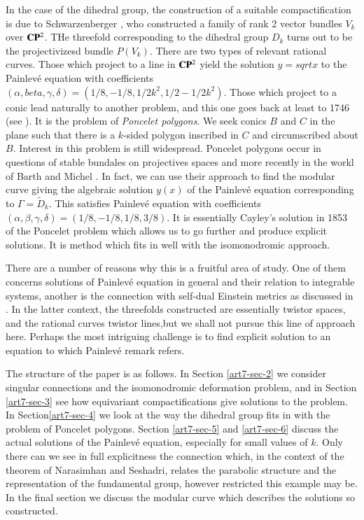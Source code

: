 In the case of the dihedral group, the construction of a suitable compactification is due to Schwarzenberger \cite{art6-key16}, who constructed a family of rank 2 vector bundles $V_{k}$ over $\mathbf{C}\mathbf{P}^{2}$. THe threefold corresponding to the dihedral group $D_{k}$ turns out to be the projectivizesd bundle $P(V_{k})$. There are two types of relevant rational curves. Those which project to a line in $\mathbf{C}\mathbf{P}^{2}$ yield the solution $y =sqrt{x}$ to the Painlev\'e equation with coefficients $(\alpha, beta, \gamma, \delta) = (1/8, -1/8, 1/2k^{2}, 1/2-1/2k^{2})$. Those which project to a conic lead naturally to another problem, and this one goes back at least to 1746 (see \cite{art7-key3}). It is the problem of \textit{Poncelet polygons}. We seek conics $B$ and $C$ in the plane such that there is a $k$-sided polygon inscribed in  $C$ and circumscribed about $B$. Interest in this problem is still widespread. Poncelet polygons occur in questions of stable bundales on projectives spaces\cite{art7-key14} and more recently in the workl of Barth and Michel \cite{art7-key1}. In fact, we can use their approach to find the modular curve giving the algebraic solution $y(x)$ of the Painlev\'e equation corresponding to $\Gamma = \tilde{D}_{k}$. This satisfies Painlev\'e equation with coefficients $(\alpha, \beta, \gamma, \delta) = (1/8, -1/8, 1/8, 3/8)$. It is essentially Cayley's solution in 1853 of the Poncelet problem which allows us to go further and produce explicit solutions. It is method which fits in well with the isomonodromic approach. 

There are a number of reasons why this is a fruitful area of study. One of them concerns solutions of Painlev\'e equation in general and their relation to integrable systems, another is the connection with self-dual Einstein metrics as discussed in \cite{art7-key6}. In the latter context, the threefolds constructed are essentially twistor spaces, and the rational curves twistor lines,but we shall not pursue this line of approach here. Perhaps the most intriguing challenge is to find  explicit solution to an equation to which Painlev\'e remark refers.

The structure of the paper is as follows. In Section \ref{art7-sec-2} we consider singular connections and the isomonodromic deformation problem, and in Section \ref{art7-sec-3} see how equivariant compactifications give solutions to the problem. In Section\ref{art7-sec-4} we look at the way the dihedral group fits in with the problem of Poncelet polygons. Section \ref{art7-sec-5} and \ref{art7-sec-6} discuss the actual solutions of the Painlev\'e equation, especially for small values of $k$. Only there can we see in full explicitness the connection which, in the context of the theorem of Narasimhan and Seshadri, relates the parabolic structure and the representation of the fundamental group, however restricted this example may be. In the final section we discuss the modular curve which describes the solutions so constructed.


